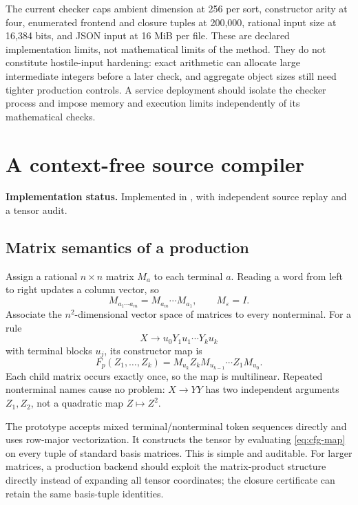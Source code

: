 \documentclass[11pt,letterpaper]{article}
\theoremstyle{definition}\newtheorem{definition}[theorem]{Definition}
\theoremstyle{remark}\newtheorem{remark}[theorem]{Remark}
\newcommand{\status}[1]{\par\noindent\textbf{Implementation status.} #1\par}
\begin{document}
The current checker caps ambient dimension at 256 per sort, constructor arity at four, enumerated frontend and closure tuples at 200,000, rational input size at 16,384 bits, and JSON input at 16 MiB per file. These are declared implementation limits, not mathematical limits of the method. They do not constitute hostile-input hardening: exact arithmetic can allocate large intermediate integers before a later check, and aggregate object sizes still need tighter production controls. A service deployment should isolate the checker process and impose memory and execution limits independently of its mathematical checks.

\section{A context-free source compiler}
\label{sec:cfg}
\status{Implemented in , with independent source replay and a tensor audit.}

\subsection{Matrix semantics of a production}
Assign a rational $n\times n$ matrix $M_a$ to each terminal $a$. Reading a word from left to right updates a column vector, so
\begin{equation}\label{eq:matrix-order}
 M_{a_1\cdots a_m}=M_{a_m}\cdots M_{a_1},\qquad M_\varepsilon=I.
\end{equation}
Associate the $n^2$-dimensional vector space of matrices to every nonterminal. For a rule
\[
 X\to u_0Y_1u_1\cdots Y_ku_k
\]
with terminal blocks $u_j$, its constructor map is
\begin{equation}\label{eq:cfg-map}
 F_p(Z_1,\ldots,Z_k)
 =M_{u_k}Z_k M_{u_{k-1}}\cdots Z_1M_{u_0}.
\end{equation}
Each child matrix occurs exactly once, so the map is multilinear. Repeated nonterminal names cause no problem: $X\to YY$ has two independent arguments $Z_1,Z_2$, not a quadratic map $Z\mapsto Z^2$.

The prototype accepts mixed terminal/nonterminal token sequences directly and uses row-major vectorization. It constructs the tensor by evaluating \eqref{eq:cfg-map} on every tuple of standard basis matrices. This is simple and auditable. For larger matrices, a production backend should exploit the matrix-product structure directly instead of expanding all tensor coordinates; the closure certificate can retain the same basis-tuple identities.
\end{document}
